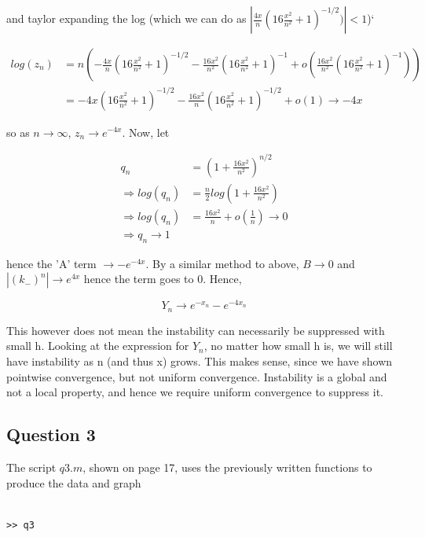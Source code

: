 \documentclass[10pt,a4paper]{report}
\begin{document}
and taylor expanding the log (which we can do as $|\frac{4x}{n}(16\frac{x^2}{n^2}+1)^{-1/2})|<1$)`

\begin{align*}
log(z_n) &= n(-\frac{4x}{n}(16\frac{x^2}{n^2}+1)^{-1/2}-\frac{16x^2}{n^2}(16\frac{x^2}{n^2}+1)^{-1}+o(\frac{16x^2}{n^2}(16\frac{x^2}{n^2}+1)^{-1}))\\
&=-4x(16\frac{x^2}{n^2}+1)^{-1/2}-	\frac{16x^2}{n}(16\frac{x^2}{n^2}+1)^{-1/2}+o(1) \rightarrow -4x
\end{align*}

so as $n\rightarrow\infty$, $z_n\rightarrow e^{-4x}$.  Now, let

\begin{align*}
q_n &= (1+\frac{16x^2}{n^2})^{n/2}\\
\Rightarrow log(q_n)&=\frac{n}{2}log(1+\frac{16x^2}{n^2})\\
\Rightarrow log(q_n)&=\frac{16x^2}{n}+o(\frac{1}{n}) \rightarrow 0\\
\Rightarrow q_n \rightarrow 1
\end{align*}

hence the 'A' term $\rightarrow -e^{-4x}$. By a similar method to above, $B\rightarrow 0 $ and $|(k_-)^n| \rightarrow e^{4x}$ hence the term goes to 0. Hence, 

\begin{equation*}
Y_n \rightarrow e^{-x_n} - e^{-4x_n}
\end{equation*}

This however does not mean the instability can necessarily be suppressed with small h. Looking at the expression for $Y_n$, no matter how small h is, we will still have instability as n (and thus x) grows. This makes sense, since we have shown pointwise convergence, but not uniform convergence. Instability is a global and not a local property, and hence we require uniform convergence to suppress it.

\newpage


\subsection*{Question 3}

The script $q3.m$, shown on page 17, uses the previously written functions to produce the data and graph

\begin{verbatim}

>> q3

\end{verbatim}
\end{document}

